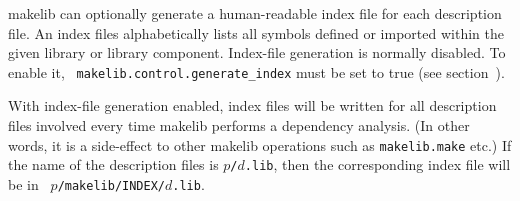 makelib can optionally generate a human-readable index file for each
description file.  An index files alphabetically lists all symbols
defined or imported within the given library or library component.
Index-file generation is normally disabled.  To enable it, {\tt
makelib.control.generate\_index} must be set to true (see
section~).

With index-file generation enabled, index files will be written for
all description files involved every time makelib performs a dependency
analysis.  (In other words, it is a side-effect to other makelib operations
such as {\tt makelib.make} etc.)  If the name of the description files is
{\tt $p$/$d$.lib}, then the corresponding index file will be in {\tt
$p$/makelib/INDEX/$d$.lib}.
